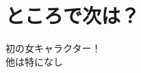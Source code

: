 \section{ところで次は？}


{
\begin{frame}[plain]

\begin{center}
\pause
{}
\end{center}

\end{frame}
}


\begin{frame}[plain]
\begin{center}
\end{center}
\end{frame}


{
\begin{frame}[plain]

\begin{center}
\pause
{}
\end{center}

\end{frame}
}


\begin{frame}[plain]
\begin{center}
\end{center}
\end{frame}

\begin{frame}

\begin{center}
\Huge{初の女キャラクター！}\\\pause
\Huge{他は特になし}
\end{center}
\end{frame}



\begin{frame}[plain]
\begin{center}
\end{center}
\end{frame}

